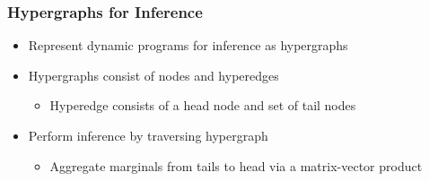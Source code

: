 \documentclass{beamer}
\begin{document}
\begin{frame}
\frametitle{Hypergraphs for Inference}
\begin{itemize}
\item Represent dynamic programs for inference as hypergraphs
\vspace{1em}
\item Hypergraphs consist of nodes and hyperedges
    \begin{itemize}
    \item Hyperedge consists of a head node and set of tail nodes
    \end{itemize}
\vspace{1em}
\item Perform inference by traversing hypergraph
    \begin{itemize}
    \item Aggregate marginals from tails to head via a matrix-vector product
    \end{itemize}
\end{itemize}
\begin{columns}

\begin{column}{0.5\textwidth}
\begin{center}
\end{center}
\end{column}

\begin{column}{0.5\textwidth}
\begin{center}
\begin{tikzpicture}




\end{tikzpicture}
\end{center}
\end{column}
\end{columns}
\end{frame}
\end{document}
